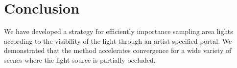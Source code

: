 \section{Conclusion}
\label{sec:conclusion}


We have developed a strategy for efficiently importance sampling area lights according to the visibility of the light through an artist-specified portal. We demonstrated that the method accelerates convergence for a wide variety of scenes where the light source is partially occluded. 
